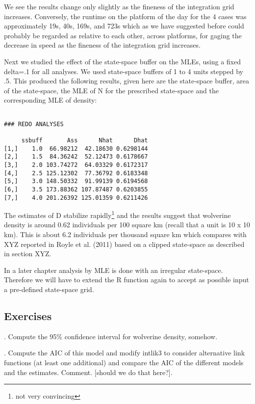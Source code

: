 We see the results change only slightly as the fineness of the
integration grid increases. Conversely, the runtime on the platform of
the day for the 4 cases was approximately 19s, 40s, 169s, and 723s
which as we have suggested before could probably be regarded as
relative to each other, across platforms, for gaging the decrease in
speed as the fineness of the integration grid increases.

Next we studied the effect of the state-space buffer on the MLEs,
using a fixed delta=.1 for all analyses. We used state-space buffers
of 1 to 4 units stepped by .5. This produced the following results,
given here are the state-space buffer, area of the state-space, the
MLE of N for the prescribed state-space and the corresponding MLE of
density:

  
\begin{verbatim}

### REDO ANALYSES 

     ssbuff       Ass      Nhat      Dhat
[1,]    1.0  66.98212  42.18630 0.6298144
[2,]    1.5  84.36242  52.12473 0.6178667
[3,]    2.0 103.74272  64.03329 0.6172317
[4,]    2.5 125.12302  77.36792 0.6183348
[5,]    3.0 148.50332  91.99139 0.6194568
[6,]    3.5 173.88362 107.87487 0.6203855
[7,]    4.0 201.26392 125.01359 0.6211426

\end{verbatim}

The estimates of D stabilize rapidly\footnote{not very convincing} and
the results suggest that wolverine density is around 0.62 individuals
per 100 square km (recall that a unit is 10 x 10 km).  This is about
6.2 individuals per thousand square km which compares with XYZ
reported in Royle et al. (2011) based on a clipped state-space as
described in section XYZ.

In a later chapter analysis by MLE is done with an irregular
state-space. Therefore we will have to extend the R function again to
accept as possible input a pre-defined state-space grid.

\subsection{
Exercises
}

{.	Compute the 95\% confidence interval for wolverine density, somehow.
}

{.	Compute the AIC of this model and modify intlik3 to consider alternative link functions (at least one additional) and compare the AIC of the different models and the estimates. Comment. [should we do that here?].
}

